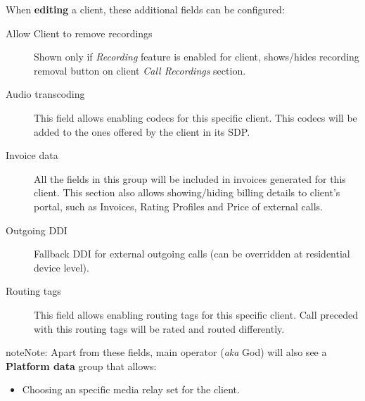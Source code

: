 \documentclass[letterpaper,10pt,english]{sphinxmanual}
\begin{document}
When \textbf{editing} a client, these additional fields can be configured:
\begin{description}
\item[{Allow Client to remove recordings}] \leavevmode{}\label{administration_portal/brand/clients/retail:term-allow-client-to-remove-recordings}
Shown only if \emph{Recording} feature is enabled for client, shows/hides recording
removal button on client \emph{Call Recordings} section.

\item[{Audio transcoding}] \leavevmode{}\label{administration_portal/brand/clients/retail:term-audio-transcoding}
This field allows enabling codecs for this specific client. This codecs will be added to
the ones offered by the client in its SDP.

\item[{Invoice data}] \leavevmode{}\label{administration_portal/brand/clients/retail:term-invoice-data}
All the fields in this group will be included in invoices generated for this client. This section also allows
showing/hiding billing details to client's portal, such as Invoices, Rating Profiles and Price of external calls.

\item[{Outgoing DDI}] \leavevmode{}\label{administration_portal/brand/clients/retail:term-outgoing-ddi}
Fallback DDI for external outgoing calls (can be overridden at residential device level).

\item[{Routing tags}] \leavevmode{}\label{administration_portal/brand/clients/retail:term-routing-tags}
This field allows enabling routing tags for this specific client. Call preceded with this
routing tags will be rated and routed differently.

\end{description}

\begin{notice}{note}{Note:}
Apart from these fields, main operator (\emph{aka} God) will also see a \textbf{Platform data} group that allows:
\begin{itemize}
\item {} 
Choosing an specific media relay set for the client.

\end{itemize}
\end{notice}
\end{document}

